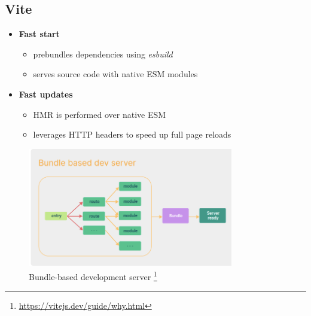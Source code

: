 \documentclass[
]{beamer}
\begin{document}
\subsection[Vite]{Vite}

\begin{frame}
  \begin{itemize}
    \item \textbf{Fast start}
    \begin{itemize}
        \item prebundles dependencies using \textit{esbuild}
        \item serves source code with native ESM modules
    \end{itemize}
    \item \textbf{Fast updates}
    \begin{itemize}
        \item HMR is performed over native ESM
        \item leverages HTTP headers to speed up full page reloads
    \end{itemize}
\end{itemize}
\end{frame}


\begin{frame}
  \begin{figure}
    \includegraphics[width=0.8\textwidth,height=\textheight,keepaspectratio]{images/bundle_dev_server.png}
    \caption{Bundle-based development server
    \footnote{\url{https://vitejs.dev/guide/why.html}}
  }
  \end{figure}
\end{frame}
\end{document}
